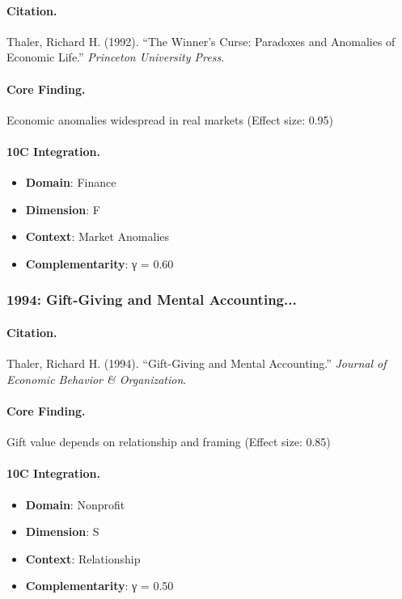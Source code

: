\paragraph{Citation.}
Thaler, Richard H. (1992). ``The Winner's Curse: Paradoxes and Anomalies of Economic Life.''
\textit{Princeton University Press}.

\paragraph{Core Finding.}
Economic anomalies widespread in real markets (Effect size: 0.95)

\paragraph{10C Integration.}
\begin{itemize}[nosep]
  \item \textbf{Domain}: Finance
  \item \textbf{Dimension}: F
  \item \textbf{Context}: Market Anomalies
  \item \textbf{Complementarity}: γ = 0.60
\end{itemize}

\subsubsection{1994: Gift-Giving and Mental Accounting...}

\paragraph{Citation.}
Thaler, Richard H. (1994). ``Gift-Giving and Mental Accounting.''
\textit{Journal of Economic Behavior & Organization}.

\paragraph{Core Finding.}
Gift value depends on relationship and framing (Effect size: 0.85)

\paragraph{10C Integration.}
\begin{itemize}[nosep]
  \item \textbf{Domain}: Nonprofit
  \item \textbf{Dimension}: S
  \item \textbf{Context}: Relationship
  \item \textbf{Complementarity}: γ = 0.50
\end{itemize}

